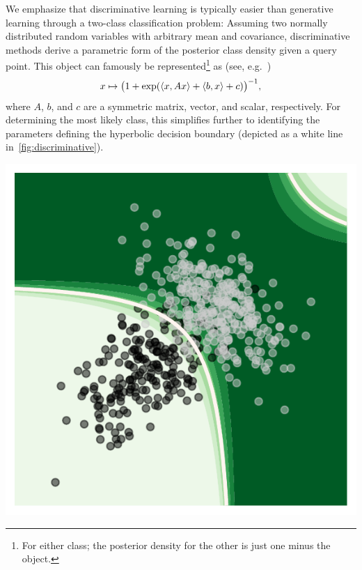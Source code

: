 We emphasize that discriminative learning is typically easier than generative learning through a two-class classification problem:
Assuming two normally distributed random variables with arbitrary mean and covariance, discriminative methods derive a parametric form of the posterior class density given a query point.
This object can famously be represented\footnote{%
	For either class; the posterior density for the other is just one minus the object.
} as (see, e.g.~\cite[section 4.2.1.]{bishop_pattern_2006})
\begin{equation}
	x \mapsto \bigl( \num{1} + \exp(\langle x, Ax \rangle + \langle b, x \rangle + c) \bigr)^{\num{-1}},
\end{equation}
where \( A \), \( b \), and \( c \) are a symmetric matrix, vector, and scalar, respectively.
For determining the most likely class, this simplifies further to identifying the parameters defining the hyperbolic decision boundary (depicted as a white line in~\cref{fig:discriminative}).
\begin{sidefigure}
	\includegraphics[width=\marginparwidth]{learning-types/discriminative}
	\caption[Discriminative two-class classification]{%
		Discriminative approach to the two-class classification problem:
		Darker green indicates higher posterior values of belonging to the \enquote{white} class.
		The white line is the hyperbolic decision boundary.
	}%
	\label{fig:discriminative}
\end{sidefigure}
